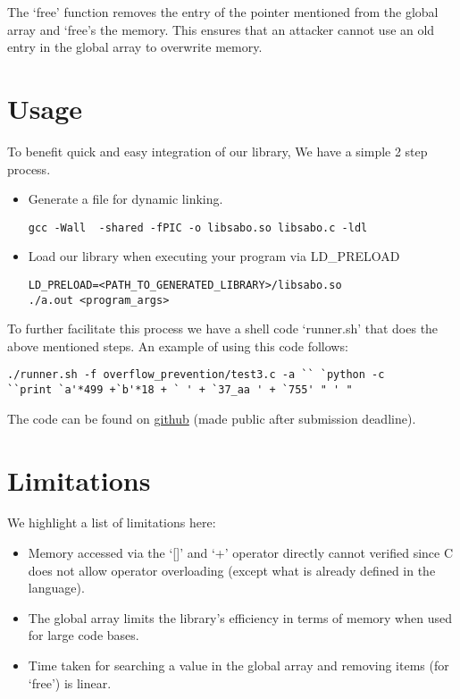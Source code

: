 \documentclass[a4paper, 12pt]{article}
\begin{document}
The `free' function removes the entry of the pointer mentioned from the global array and `free's the memory.  This ensures that an attacker cannot use an old entry in the global array to overwrite memory.

\section{Usage}

To benefit quick and easy integration of our library, We have a simple 2 step process.
\begin{itemize}
\item Generate a file for dynamic linking.
\lstset{language=bash}
\begin{lstlisting}
gcc -Wall  -shared -fPIC -o libsabo.so libsabo.c -ldl
\end{lstlisting}
\item Load our library when executing your program via LD\_PRELOAD
\begin{lstlisting}
LD_PRELOAD=<PATH_TO_GENERATED_LIBRARY>/libsabo.so
./a.out <program_args>
\end{lstlisting}
\end{itemize}

To further facilitate this process we have a shell code `runner.sh' that does the above mentioned steps.  An example of using this code follows:
\begin{lstlisting}[frame=single]
./runner.sh -f overflow_prevention/test3.c -a `` `python -c
``print `a'*499 +`b'*18 + ` ' + `37_aa ' + `755' " ' "
\end{lstlisting}

The code can be found on \href{https://github.com/yugarsi/sabo}{github} (made public after submission deadline).

\section{Limitations}
We highlight a list of limitations here:
\begin{itemize}
\item Memory accessed via the `[]' and `+' operator directly cannot verified since C does not allow operator overloading (except what is already defined in the language).
\item The global array limits the library's efficiency in terms of memory when used for large code bases.
\item Time taken for searching a value in the global array and removing items (for `free') is linear.
\end{itemize}
\end{document}
